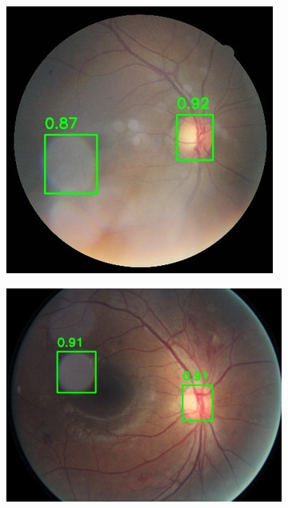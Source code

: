 \documentclass[12pt]{article}
\begin{document}
\begin{figure}
    \centering
    \begin{subfigure}[b]{0.47\textwidth}
        \centering
        \includegraphics[width=\textwidth]{images/multiple_boxes/TRAIN003802_boxes.jpg}
        \label{fig:multiple_boxes_1}
    \end{subfigure}
    \hfill
    \begin{subfigure}[b]{0.47\textwidth}
        \centering
        \includegraphics[width=\textwidth]{images/multiple_boxes/TRAIN031744_boxes.jpg}

\end{subfigure}
\end{figure}
\end{document}
